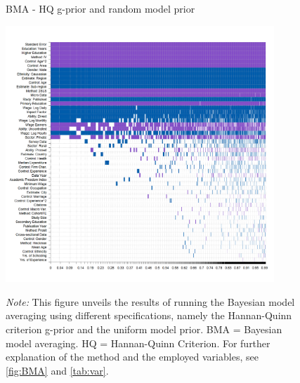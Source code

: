 \begin{figure}[!htbp]
\begin{center}
\caption{BMA - HQ g-prior and random model prior}
\label{fig:BMA4}
\includegraphics[width=0.9\textwidth]{Figures/bma_Hannan-Quinn_random_results.png}
\end{center}\vspace{-0.5cm}
\captionsetup{width=0.9\textwidth, font = scriptsize}
\caption*{\emph{Note:} This figure unveils the results of running the Bayesian model averaging using different specifications, namely the Hannan-Quinn criterion g-prior and the uniform model prior. BMA = Bayesian model averaging. HQ = Hannan-Quinn Criterion. For further explanation of the method and the employed variables, see \autoref{fig:BMA} and \autoref{tab:var}.
}
\end{figure}



